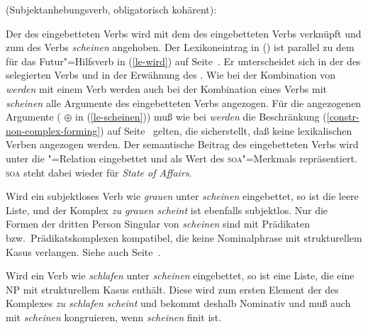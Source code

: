 {\eas
\label{le-scheinen}
 (Subjektanhebungsverb, obligatorisch kohärent):\\
\zs

\noindent
Der \subjw des eingebetteten Verbs  wird mit dem \subcatw des
eingebetteten Verbs  verknüpft und zum \subcatw des Verbs \emph{scheinen} angehoben.
Der Lexikoneintrag in () ist parallel zu dem für das Futur"=Hilfsverb in (\ref{le-wird})
auf Seite~\pageref{le-wird}. Er unterscheidet sich in der \vform des selegierten Verbs und in der Erwähnung des \subjms.
Wie bei der Kombination von \emph{werden} mit einem Verb werden auch bei der Kombination
eines Verbs mit \emph{scheinen} alle Argumente des eingebetteten Verbs angezogen.
Für die angezogenen Argumente ( $\oplus$  in (\ref{le-scheinen})) muß wie bei \emph{werden}
die Beschränkung (\ref{constr-non-complex-forming}) auf Seite~\pageref{constr-non-complex-forming} gelten,
die sicherstellt, daß keine lexikalischen Verben angezogen werden.
Der semantische Beitrag des eingebetteten Verbs wird unter die "=Relation eingebettet
und als Wert des \textsc{soa}"=Merkmals repräsentiert. \textsc{soa} steht dabei wieder für \emph{State of Affairs}.

Wird ein subjektloses Verb wie \emph{grauen} unter \emph{scheinen} eingebettet, so
ist  die leere Liste, und der Komplex \emph{zu grauen scheint} ist ebenfalls
subjektlos. Nur die Formen der dritten Person Singular von \emph{scheinen}
sind mit Prädikaten bzw.\ Prädikatskomplexen kompatibel, 
die keine Nominalphrase mit strukturellem Kasus verlangen. Siehe auch Seite~\pageref{page-kongruenz-scheinen}.

Wird ein Verb wie \emph{schlafen} unter \emph{scheinen} eingebettet, so ist
 eine Liste, die eine NP mit strukturellem Kasus enthält. Diese wird
zum ersten Element der \subcatl des Komplexes \emph{zu schlafen scheint} und bekommt
deshalb Nominativ und muß auch mit \emph{scheinen} kongruieren,
wenn \emph{scheinen} finit ist.

}
